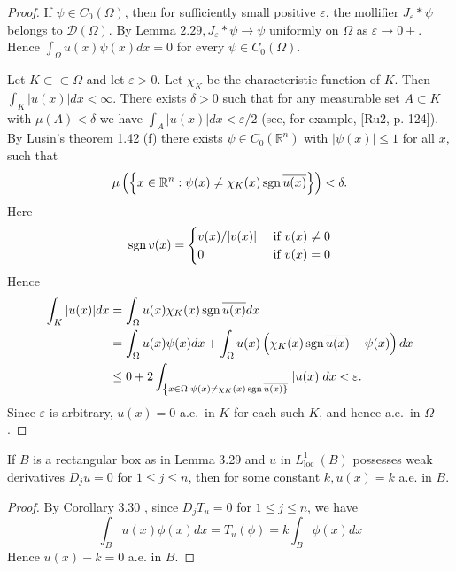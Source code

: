 \begin{proof}
  If $\psi \in C_0(\Omega)$, then for sufficiently small positive $\varepsilon$, the mollifier $J_\varepsilon * \psi$ belongs to $\mathscr{D}(\Omega)$. By Lemma $2.29, J_\varepsilon * \psi \rightarrow \psi$ uniformly on $\Omega$ as $\varepsilon \rightarrow 0+$. Hence $\int_{\Omega} u(x) \psi(x) d x=0$ for every $\psi \in C_0(\Omega)$.
  
  Let $K \subset\subset \Omega$ and let $\varepsilon>0$. Let $\chi_K$ be the characteristic function of $K$. Then $\int_K|u(x)| d x<\infty$. There exists $\delta>0$ such that for any measurable set $A \subset K$ with $\mu(A)<\delta$ we have $\int_A|u(x)| d x<\varepsilon / 2$ (see, for example, [Ru2, p. 124]). By Lusin's theorem 1.42 (f) there exists $\psi \in C_0\left(\mathbb{R}^n\right)$ with $|\psi(x)| \leq 1$ for all $x$, such that
  \[
  \mu\left(\left\{x \in \mathbb{R}^n: \psi(x) \neq \chi_K(x) \operatorname{sgn} \overline{u(x)}\right\}\right)<\delta .
  \]
  Here
  \[
  \operatorname{sgn} v(x)= \begin{cases}v(x) /|v(x)| & \text { if } v(x) \neq 0 \\ 0 & \text { if } v(x)=0\end{cases}
  \]
  Hence
  \[
  \begin{aligned}
  \int_K|u(x)| d x & =\int_{\Omega} u(x) \chi_K(x) \operatorname{sgn} \overline{u(x)} d x \\
  & =\int_{\Omega} u(x) \psi(x) d x+\int_{\Omega} u(x)\left(\chi_K(x) \operatorname{sgn} \overline{u(x)}-\psi(x)\right) d x \\
  & \leq 0+2 \int_{\left\{x \in \Omega: \psi(x) \neq \chi_K(x) \operatorname{sgn} \overline{u(x)\}}\right.}|u(x)| d x<\varepsilon .
  \end{aligned}
  \]
  Since $\varepsilon$ is arbitrary, $u(x)=0$ a.e.~in $K$ for each such $K$,
  and hence a.e.~in $\Omega$.
\end{proof}


\begin{corollary}
  If $B$ is a rectangular box as in Lemma 3.29 and $u$ in $L_{\text {loc }}^1(B)$ possesses weak derivatives $D_j u=0$ for $1 \leq j \leq n$, then for some constant $k, u(x)=k$ a.e. in $B$.
\end{corollary}

\begin{proof}
  By Corollary 3.30 , since $D_j T_u=0$ for $1 \leq j \leq n$, we have
  \[
  \int_B u(x) \phi(x) d x=T_u(\phi)=k \int_B \phi(x) d x
  \]
  Hence $u(x)-k=0$ a.e. in $B$.
\end{proof}


